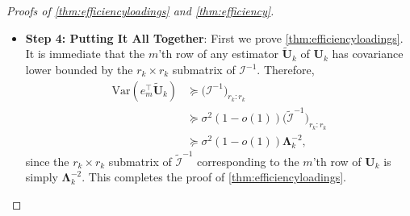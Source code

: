 \documentclass[10pt]{article}
\newcommand{\0}{{\mathbf{0}}}
\newcommand{\1}{{\mathbf{1}}}
\newcommand{\U}{{\mathbf{U}}}
\renewcommand{\t}{^{\top}}
\newcommand{\utilde}{\mathbf{\tilde{U}}}
\newcommand{\inv}{^{-1}}
\renewcommand{\tilde}{\widetilde}
\begin{document}
\begin{proof}[Proofs of \cref{thm:efficiencyloadings} and \cref{thm:efficiency}]
\begin{itemize}
\begin{align*}
    \| \mathcal{H} \| &\lesssim \kappa^2 \lambda^2 \mu_0 \sqrt{\frac{r}{p}}.
\end{align*}
Therefore,
\begin{align*}
    \| \mathcal{\tilde I}\inv \mathcal{H} \| &\leq \| \mathcal{\tilde I}\inv \| \|\mathcal{H} \| \\
    &\leq \frac{1}{\lambda^2} \|\mathcal{H} \| \\
    &\lesssim \kappa^2 \mu_0 \sqrt{\frac{r}{p}} \\
    &\ll 1,
\end{align*}
provided that $\kappa^2  \mu_0 \sqrt{\frac{r}{p}} \ll 1$.

Therefore, the following series expansion is justified:
\begin{align*}
    (\sigma^2\mathcal{I})\inv &= \bigg( \mathcal{I} + \mathcal{H}\bigg)\inv \\
    &= \Bigg[ \mathcal{\tilde I} \bigg( \mathbf{I}_{p_1p_2p_3r_1r_2r_3} + \mathcal{\tilde I}\inv \mathcal{H} \bigg) \Bigg]\inv \\
    &= \bigg(  \mathbf{I}_{p_1p_2p_3r_1r_2r_3} + \mathcal{\tilde I}\inv \mathcal{H} \bigg)\inv \mathcal{\tilde I}\inv \\
    &= \sum_{k=0}^{\infty} \big(  \mathcal{\tilde I}\inv \mathcal{H} \big)^k,
\end{align*}
and hence that
\begin{align*}
    \mathcal{I}\inv &= \sigma^2 \sum_{k=0}^{\infty} \big(  \mathcal{\tilde I}\inv \mathcal{H} \big)^k \mathcal{\tilde I}\inv \\
    &= \sigma^2  \mathcal{\tilde I}\inv + \sigma^2 \sum_{k=1}^{\infty} \big(  \mathcal{\tilde I}\inv \mathcal{H} \big)^k \mathcal{\tilde I}\inv \\
    &= \sigma^2 (1 - o(1)) \mathcal{\tilde I}\inv,
\end{align*}
where the $o(1)$ is taken to be with respect to the positive semidefinite ordering. 
\item 
\textbf{Step 4: Putting It All Together}: First we prove \cref{thm:efficiencyloadings}.   It is immediate that the $m$'th row of any estimator $\mathbf{\tilde U}_k$ of $\U_k$ has covariance lower bounded by the $r_k \times r_k$ submatrix of $\mathcal{I}\inv$.  Therefore,
\begin{align*}
    \mathrm{Var}( e_m\t \utilde_k ) &\succcurlyeq \big(\mathcal{I}\inv\big)_{r_k: r_k} \\
    &\succcurlyeq \sigma^2 (1 - o(1)) \big(\mathcal{\tilde I}\inv\big)_{r_k: r_k} \\
    &\succcurlyeq \sigma^2 (1- o(1)) \mathbf{\Lambda}_k^{-2},
\end{align*}
since the $r_k \times r_k$ submatrix of $\mathcal{\tilde I}\inv$ corresponding to the $m$'th row of $\U_k$ is simply $\mathbf{\Lambda}_k^{-2}$.  This completes the proof of \cref{thm:efficiencyloadings}.


\end{itemize}
\end{proof}
\end{document}
